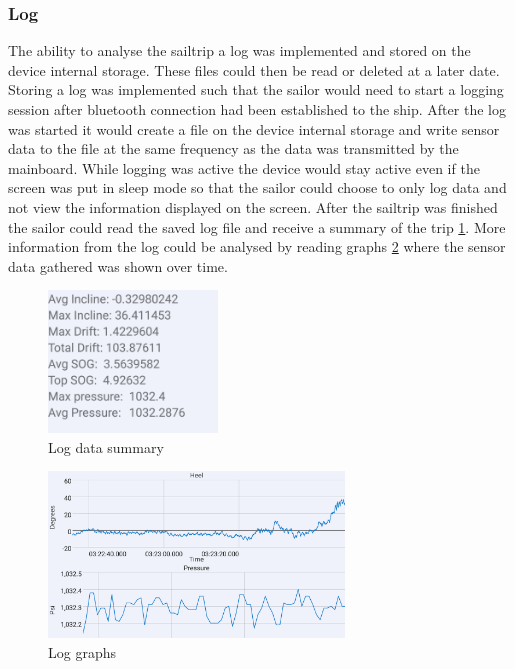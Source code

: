 \subsubsection{Log}
The ability to analyse the sailtrip a log was implemented and stored on the device internal storage. These files could then be read or deleted at a later date. Storing a log was implemented such that the sailor would need to start a logging session after bluetooth connection had been established to the ship. After the log was started it would create a file on the device internal storage and write sensor data to the file at the same frequency as the data was transmitted by the mainboard. While logging was active the device would stay active even if the screen was put in sleep mode so that the sailor could choose to only log data and not view the information displayed on the screen. After the sailtrip was finished the sailor could read the saved log file and receive a summary of the trip \ref{log-summary}. More information from the log could be analysed by reading graphs \ref{log-graph} where the sensor data gathered was shown over time.

\begin{figure}[H]
\centering
\includegraphics[width=0.4\textwidth]{Figures/log_data.png}
\caption{Log data summary}
\label{log-summary}
\end{figure}

\begin{figure}[H]
\centering
\includegraphics[width=0.7\textwidth]{Figures/log_graph.png}
\caption{Log graphs}
\label{log-graph}
\end{figure}

